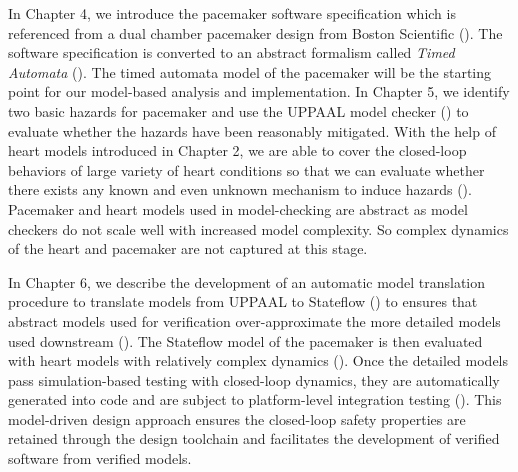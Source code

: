 In Chapter 4, we introduce the pacemaker software specification which is referenced from a dual chamber pacemaker design from Boston Scientific (\cite{compass}). The software specification is converted to an abstract formalism called \emph{Timed Automata} (\cite{timed_automata}). The timed automata model of the pacemaker will be the starting point for our model-based analysis and implementation. In Chapter 5, we identify two basic hazards for pacemaker and use the UPPAAL model checker (\cite{uppaal}) to evaluate whether the hazards have been reasonably mitigated. With the help of heart models introduced in Chapter 2, we are able to cover the closed-loop behaviors of large variety of heart conditions so that we can evaluate whether there exists any known and even unknown mechanism to induce hazards (\cite{STTT13}). Pacemaker and heart models used in model-checking are abstract as model checkers do not scale well with increased model complexity. So complex dynamics of the heart and pacemaker are not captured at this stage. 

In Chapter 6, we describe the development of an automatic model translation procedure to translate models from UPPAAL to Stateflow (\cite{stateflow}) to ensures that abstract models used for verification over-approximate the more detailed models used downstream (\cite{RTAS12}). The Stateflow model of the pacemaker is then evaluated with heart models with relatively complex dynamics (\cite{vhm_ecrts10, vhm_embc11,vhm_iccps11}). Once the detailed models pass simulation-based testing with closed-loop dynamics, they are automatically generated into code and are subject to platform-level integration testing (\cite{vhm_website}). This model-driven design approach ensures the closed-loop safety properties are retained through the design toolchain and facilitates the development of verified software from verified models.


